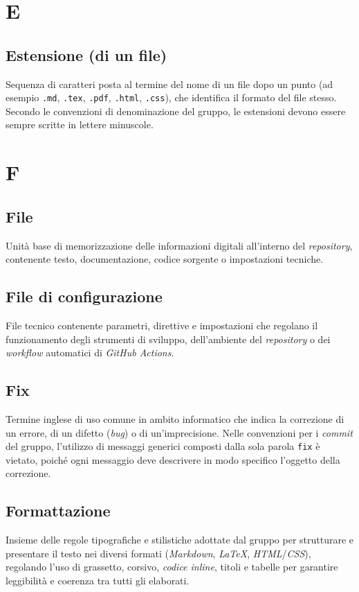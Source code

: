 \documentclass[11pt, a4paper]{article}
\begin{document}
\newpage

\section*{E}

\subsection*{Estensione (di un file)}
Sequenza di caratteri posta al termine del nome di un file dopo un punto (ad esempio \texttt{.md}, \texttt{.tex}, \texttt{.pdf}, \texttt{.html}, \texttt{.css}), che identifica il formato del file stesso. Secondo le convenzioni di denominazione del gruppo, le estensioni devono essere sempre scritte in lettere minuscole.

\section*{F}

\subsection*{File}
Unità base di memorizzazione delle informazioni digitali all'interno del \textit{repository}, contenente testo, documentazione, codice sorgente o impostazioni tecniche.

\subsection*{File di configurazione}
File tecnico contenente parametri, direttive e impostazioni che regolano il funzionamento degli strumenti di sviluppo, dell'ambiente del \textit{repository} o dei \textit{workflow} automatici di \textit{GitHub Actions}.

\subsection*{Fix}
Termine inglese di uso comune in ambito informatico che indica la correzione di un errore, di un difetto (\textit{bug}) o di un'imprecisione. Nelle convenzioni per i \textit{commit} del gruppo, l'utilizzo di messaggi generici composti dalla sola parola \texttt{fix} è vietato, poiché ogni messaggio deve descrivere in modo specifico l'oggetto della correzione.

\subsection*{Formattazione}
Insieme delle regole tipografiche e stilistiche adottate dal gruppo per strutturare e presentare il testo nei diversi formati (\textit{Markdown}, \textit{LaTeX}, \textit{HTML}/\textit{CSS}), regolando l'uso di grassetto, corsivo, \textit{codice inline}, titoli e tabelle per garantire leggibilità e coerenza tra tutti gli elaborati.
\end{document}
